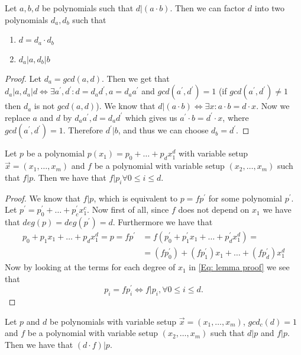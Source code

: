 \begin{lemma}\label{Lemma0}
  Let $a,b,d$ be polynomials such that $d|(a\cdot b)$. Then we can factor $d$ into two polynomials $d_a,d_b$ such that
  \begin{enumerate}
    \item $d = d_a\cdot d_b$
    \item $d_a|a, d_b|b$
  \end{enumerate}
\end{lemma}
\begin{proof}
  Let $d_a = gcd(a,d)$. Then we get that $d_a|a, d_a|d \iff \exists a^\prime,d^\prime: d=d_ad^\prime, a=d_aa^\prime$ and $gcd(a^\prime,d^\prime)=1$ (if $gcd(a^\prime,d^\prime)\neq 1$ then $d_a$ is not $gcd(a,d)$). We know that $d|(a\cdot b) \iff \exists x: a\cdot b=d\cdot x$. Now we replace $a$ and $d$ by $d_aa^\prime, d=d_ad^\prime$ which gives us $a^\prime\cdot b=d^\prime \cdot x$, where $gcd(a^\prime,d^\prime)=1$. Therefore $d^\prime|b$, and thus we can choose $d_b=d^\prime$.
\end{proof}
\begin{lemma}\label{Lemma1}
  Let $p$ be a polynomial $p(x_1)=p_0+\ldots+p_dx_1^d$ with variable setup $\vec{x}=(x_1,\ldots,x_m)$ and $f$ be a polynomial with variable setup $(x_2,\ldots,x_m)$ such that $f|p$. Then we have that $f|p_i\forall 0\leq i\leq d$.
\end{lemma}
\begin{proof}
  We know that $f|p$, which is equivalent to $p=fp^\prime$ for some polynomial $p^\prime$. Let $p^\prime=p_0^\prime+\ldots+p_c^\prime x_1^c$. Now first of all, since $f$ does not depend on $x_1$ we have that $deg(p)=deg(p^\prime)=d$. Furthermore we have that
  \begin{equation}\label{Eq: lemma proof}
    \begin{split}
      p_0+p_1x_1+\ldots+p_dx_1^d=p=fp^\prime &=f(p_0^\prime+p_1^\prime x_1+\ldots+p_d^\prime x_1^d)= \\
      &=(fp_0^\prime)+(fp_1^\prime)x_1+\ldots+(fp_d^\prime)x_1^d
    \end{split}
  \end{equation}
  Now by looking at the terms for each degree of $x_1$ in \eqref{Eq: lemma proof} we see that
  \begin{equation}
    p_i=fp_i^\prime \iff f|p_i, \forall 0\leq i\leq d.
  \end{equation}
\end{proof}
\begin{lemma}\label{Lemma2}
  Let $p$ and $d$ be polynomials with variable setup $\vec{x}=(x_1,\ldots,x_m)$, $gcd_c(d)=1$ and $f$ be a polynomial with variable setup $(x_2,\ldots,x_m)$ such that $d|p$ and $f|p$. Then we have that $(d\cdot f)|p$.
\end{lemma}
